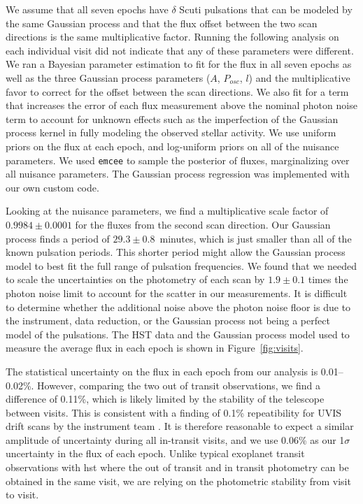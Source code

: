 \documentclass[longauth]{aa} %
\begin{document}
We assume that all seven epochs have $\delta$ Scuti pulsations that can be modeled by the same Gaussian process and that the flux offset between the two scan directions is the same multiplicative factor.
%
Running the following analysis on each individual visit did not indicate that any of these parameters were different.
%
We ran a Bayesian parameter estimation to fit for the flux in all seven epochs as well as the three Gaussian process parameters ($A$, $P_{osc}$, $l$) and the multiplicative favor to correct for the offset between the scan directions.
%
We also fit for a term that increases the error of each flux measurement above the nominal photon noise term to account for unknown effects such as the imperfection of the Gaussian process kernel in fully modeling the observed stellar activity.
%
We use uniform priors on the flux at each epoch, and log-uniform priors on all of the nuisance parameters.
%
We used \texttt{emcee} \citep{ForemanMackey13} to sample the posterior of fluxes, marginalizing over all nuisance parameters.
%
The Gaussian process regression was implemented with our own custom code.

Looking at the nuisance parameters, we find a multiplicative scale factor of $0.9984 \pm 0.0001$ for the fluxes from the second scan direction.
%
Our Gaussian process finds a period of $29.3 \pm 0.8$~minutes, which is just smaller than all of the known pulsation periods.
%
This shorter period might allow the Gaussian process model to best fit the full range of pulsation frequencies.
%
We found that we needed to scale the uncertainties on the photometry of each scan by $1.9 \pm 0.1$ times the photon noise limit to account for the scatter in our measurements.
%
It is difficult to determine whether the additional noise above the photon noise floor is due to the instrument, data reduction, or the Gaussian process not being a perfect model of the pulsations. 
%
The HST data and the Gaussian process model used to measure the average flux in each epoch is shown in Figure~\ref{fig:visits}.

The statistical uncertainty on the flux in each epoch from our analysis is 0.01--0.02\%.
%
However, comparing the two out of transit observations, we find a difference of 0.11\%, which is likely limited by the stability of the telescope between visits. 
%
This is consistent with a finding of 0.1\%  repeatibility for UVIS drift scans by the instrument team \citep[Instrument Science Report WFC3 2017-21;][]{Shanahan2019}.
%
It is therefore reasonable to expect a similar amplitude of uncertainty during all in-transit visits, and we use 0.06\% as our 1$\sigma$ uncertainty in the flux of each epoch.
%
Unlike typical exoplanet transit observations with \ac{hst} where the out of transit and in transit photometry can be obtained in the same visit, we are relying on the photometric stability from visit to visit. 
\end{document}
